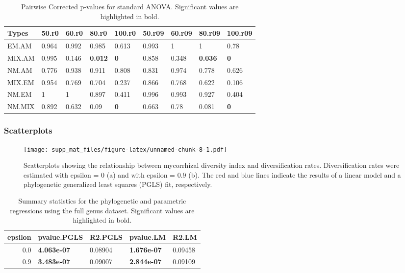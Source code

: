 \documentclass[]{article}
\begin{document}
\begin{table}[H]

\caption{\label{tab:unnamed-chunk-7}Pairwise Corrected p-values for standard ANOVA. Significant values are highlighted in bold.}
\centering
\begin{tabular}{l|l|l|l|l|l|l|l|l}
\hline
Types & 50.r0 & 60.r0 & 80.r0 & 100.r0 & 50.r09 & 60.r09 & 80.r09 & 100.r09\\
\hline
EM.AM & 0.964 & 0.992 & 0.985 & 0.613 & 0.993 & 1 & 1 & 0.78\\
\hline
MIX.AM & 0.995 & 0.146 & \textbf{0.012} & \textbf{0} & 0.858 & 0.348 & \textbf{0.036} & \textbf{0}\\
\hline
NM.AM & 0.776 & 0.938 & 0.911 & 0.808 & 0.831 & 0.974 & 0.778 & 0.626\\
\hline
MIX.EM & 0.954 & 0.769 & 0.704 & 0.237 & 0.866 & 0.768 & 0.622 & 0.106\\
\hline
NM.EM & 1 & 1 & 0.897 & 0.411 & 0.996 & 0.993 & 0.927 & 0.404\\
\hline
NM.MIX & 0.892 & 0.632 & 0.09 & \textbf{0} & 0.663 & 0.78 & 0.081 & \textbf{0}\\
\hline
\end{tabular}
\end{table}

\hypertarget{scatterplots}{%
\subsubsection{Scatterplots}\label{scatterplots}}

\begin{figure}
\centering
\texttt{[image: supp\_mat\_files/figure-latex/unnamed-chunk-8-1.pdf]}
\caption{Scatterplots showing the relationship between mycorrhizal
diversity index and diversification rates. Diversification rates were
estimated with epsilon = 0 (a) and with epsilon = 0.9 (b). The red and
blue lines indicate the results of a linear model and a phylogenetic
generalized least squares (PGLS) fit, respectively.}
\end{figure}

\begin{table}[H]

\caption{\label{tab:unnamed-chunk-9}Summary statistics for the phylogenetic and parametric regressions using the full genus dataset. Significant values are highlighted in bold.}
\centering
\begin{tabular}{r|l|l|l|l}
\hline
epsilon & pvalue.PGLS & R2.PGLS & pvalue.LM & R2.LM\\
\hline
0.0 & \textbf{4.063e-07} & 0.08904 & \textbf{1.676e-07} & 0.09458\\
\hline
0.9 & \textbf{3.483e-07} & 0.09007 & \textbf{2.844e-07} & 0.09109\\
\hline
\end{tabular}
\end{table}
\end{document}
